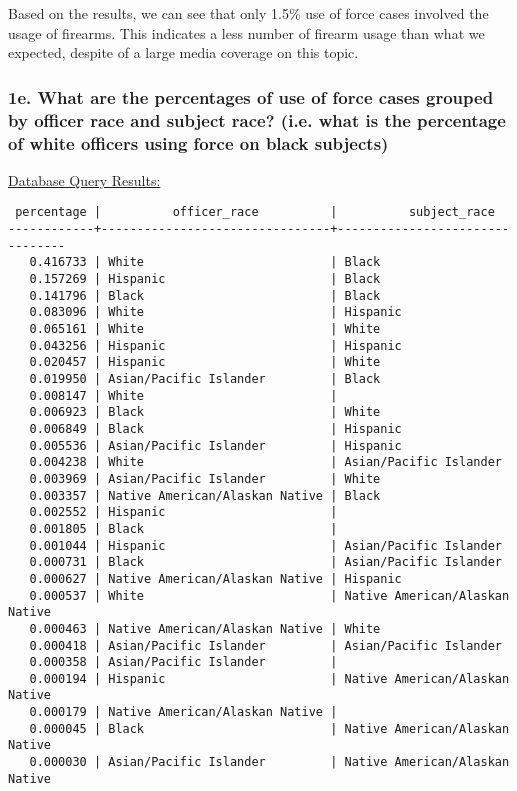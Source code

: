 \documentclass[10pt]{article}
\begin{document}
Based on the results, we can see that only 1.5\% use of force cases involved the usage of firearms. This indicates a less number of firearm usage than what we expected, despite of a large media coverage on this topic.


\subsubsection*{1e. What are the percentages of use of force cases grouped by officer race and subject race? (i.e. what is the percentage of white officers using force on black subjects)}

\underline{Database Query Results:}

\begin{verbatim}
 percentage |          officer_race          |          subject_race
------------+--------------------------------+--------------------------------
   0.416733 | White                          | Black
   0.157269 | Hispanic                       | Black
   0.141796 | Black                          | Black
   0.083096 | White                          | Hispanic
   0.065161 | White                          | White
   0.043256 | Hispanic                       | Hispanic
   0.020457 | Hispanic                       | White
   0.019950 | Asian/Pacific Islander         | Black
   0.008147 | White                          |
   0.006923 | Black                          | White
   0.006849 | Black                          | Hispanic
   0.005536 | Asian/Pacific Islander         | Hispanic
   0.004238 | White                          | Asian/Pacific Islander
   0.003969 | Asian/Pacific Islander         | White
   0.003357 | Native American/Alaskan Native | Black
   0.002552 | Hispanic                       |
   0.001805 | Black                          |
   0.001044 | Hispanic                       | Asian/Pacific Islander
   0.000731 | Black                          | Asian/Pacific Islander
   0.000627 | Native American/Alaskan Native | Hispanic
   0.000537 | White                          | Native American/Alaskan Native
   0.000463 | Native American/Alaskan Native | White
   0.000418 | Asian/Pacific Islander         | Asian/Pacific Islander
   0.000358 | Asian/Pacific Islander         |
   0.000194 | Hispanic                       | Native American/Alaskan Native
   0.000179 | Native American/Alaskan Native |
   0.000045 | Black                          | Native American/Alaskan Native
   0.000030 | Asian/Pacific Islander         | Native American/Alaskan Native
\end{verbatim}
\end{document}
